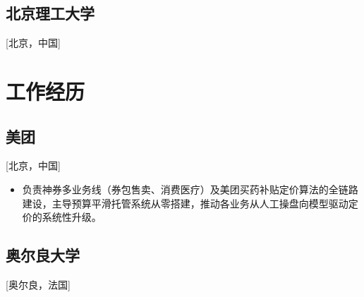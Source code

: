 \documentclass{mycv}
\begin{document}
\begin{positions}
\end{positions}

\vspace{-\parskip}

\subsection{\large 北京理工大学}[北京，中国]

\vspace{0.3em}

\begin{positions}
\end{positions}

\vspace{-1em}

\section{工作经历}

\subsection{\large 美团}[北京，中国]


\begin{positions}
\end{positions}

\begin{itemize}
  \item 负责神券多业务线（券包售卖、消费医疗）及美团买药补贴定价算法的全链路建设，主导预算平滑托管系统从零搭建，推动各业务从人工操盘向模型驱动定价的系统性升级。
\end{itemize}

\vspace{-0.5em}

\subsection{\large 奥尔良大学}[奥尔良，法国]
\end{document}
